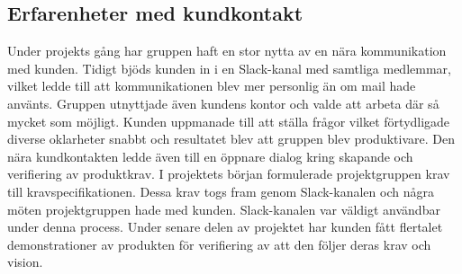 \subsection{Erfarenheter med kundkontakt}
Under projekts gång har gruppen haft en stor nytta av en nära kommunikation med kunden. Tidigt bjöds kunden in i en Slack-kanal med samtliga medlemmar, vilket ledde till att kommunikationen blev mer personlig än om mail hade använts. Gruppen utnyttjade även kundens kontor och valde att arbeta där så mycket som möjligt. Kunden uppmanade till att ställa frågor vilket förtydligade diverse oklarheter snabbt och resultatet blev att gruppen blev produktivare. Den nära kundkontakten ledde även till en öppnare dialog kring skapande och verifiering av produktkrav. I projektets början formulerade projektgruppen krav till kravspecifikationen. Dessa krav togs fram genom Slack-kanalen och några möten projektgruppen hade med kunden. Slack-kanalen var väldigt användbar under denna process. Under senare delen av projektet har kunden fått flertalet demonstrationer av produkten för verifiering av att den följer deras krav och vision.


